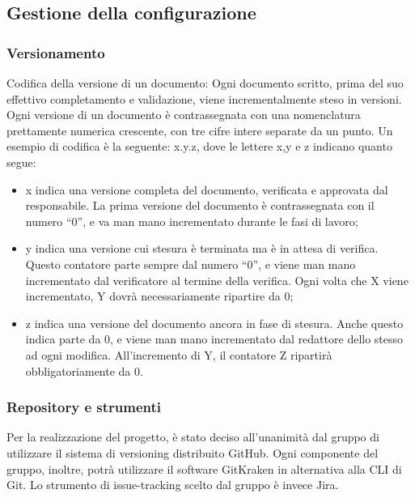 \subsection{Gestione della configurazione}

\subsubsection{Versionamento}
Codifica della versione di un documento:
Ogni documento scritto, prima del suo effettivo completamento e validazione, viene incrementalmente steso in versioni. Ogni versione di un documento è contrassegnata con una nomenclatura prettamente numerica crescente, con tre cifre intere separate da un punto. Un esempio di codifica è la seguente: x.y.z, dove le lettere x,y e z indicano quanto segue:
\begin{itemize}
	\item x indica una versione completa del documento, verificata e approvata dal responsabile. La prima versione del documento è contrassegnata con il numero “0”, e va man mano incrementato durante le fasi di lavoro;
	\item y indica una versione cui stesura è terminata ma è in attesa di verifica. Questo contatore parte sempre dal numero “0”, e viene man mano incrementato dal verificatore al termine della verifica. Ogni volta che X viene incrementato, Y dovrà necessariamente ripartire da 0;
	\item z indica una versione del documento ancora in fase di stesura. Anche questo indica parte da 0, e viene man mano incrementato dal redattore dello stesso ad ogni modifica. All’incremento di Y, il contatore Z ripartirà obbligatoriamente da 0.
	\end{itemize}

\subsubsection{Repository e strumenti}
Per la realizzazione del progetto, è stato deciso all’unanimità dal gruppo di utilizzare il sistema di versioning distribuito GitHub. Ogni componente del gruppo, inoltre, potrà utilizzare il software GitKraken in alternativa alla CLI di Git. Lo strumento di issue-tracking scelto dal gruppo è invece Jira.

